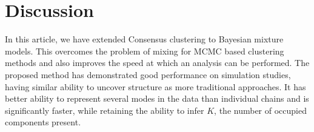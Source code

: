 \documentclass{bioinfo}
\begin{document}
%
%





\section{Discussion}

In this article, we have extended Consensus clustering to Bayesian mixture models. This overcomes the problem of mixing for MCMC based clustering methods and also improves the speed at which an analysis can be performed. The proposed method has demonstrated good performance on simulation studies, having similar ability to uncover structure as more traditional approaches. It has better ability to represent several modes in the data than individual chains and is significantly faster, while retaining the ability to infer $K$, the number of occupied components present. 
\end{document}
